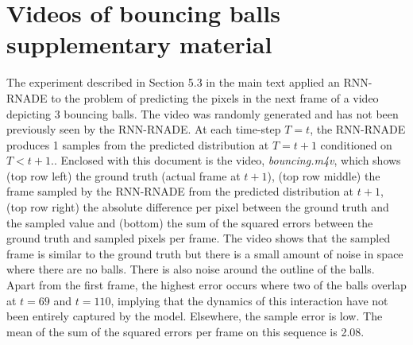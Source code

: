\documentclass{article} %
\begin{document}
 \section{Videos of bouncing balls supplementary material}
The experiment described in Section 5.3 in the main text applied an RNN-RNADE to the problem of predicting the pixels in the next frame of a video depicting 3 bouncing balls. The video was randomly generated and has not been previously seen by the RNN-RNADE. At each time-step \(T=t\), the RNN-RNADE produces 1 samples from the predicted distribution at \(T=t+1\) conditioned on \(T<t+1\).. Enclosed with this document is the video, {\it bouncing.m4v}, which shows (top row left) the ground truth (actual frame at \(t+1\)), (top row middle) the frame sampled by the RNN-RNADE from the predicted distribution at  \(t+1\), (top row right) the absolute difference per pixel between the ground truth and the sampled value and (bottom) the sum of the squared errors between the ground truth and sampled pixels per frame. The video shows that the sampled frame is similar to the ground truth but there is a small amount of noise in space where there are no balls. There is also noise around the outline of the balls. Apart from the first frame, the highest error occurs where two of the balls overlap at \(t=69\) and \(t=110\), implying that the dynamics of this interaction have not been entirely captured by the model. Elsewhere, the sample error is low. The mean of the sum of the squared errors per frame on this sequence is 2.08. 

\newpage


\end{document}

